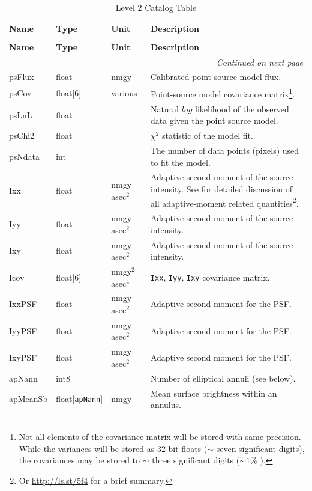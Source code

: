 \documentclass[SE,lsstdraft,toc]{lsstdoc}
\newcommand{\oldtext}[1]{{\color{red} #1}}
\newenvironment{schema}[3]{%
\setlength\LTleft{0pt}
\setlength\LTright{\fill}
\begin{longtable}{p{0.2\textwidth}p{0.14\textwidth}p{0.14\textwidth}p{0.41\textwidth}}

\caption[#1]{#2\label{#3}}\\

\hline \textbf{Name} & \textbf{Type} & \textbf{Unit} & \textbf{Description}\\ \hline
\endfirsthead

\caption[#1]{#2}\\

\hline \textbf{Name} & \textbf{Type} & \textbf{Unit} & \textbf{Description}\\ \hline
\endhead

\hline \multicolumn{4}{r}{\emph{Continued on next page}} \\
\endfoot

\hline\hline
\endlastfoot
}{%
\hline
\end{longtable}
}
\begin{document}
\begin{schema}{\Source Table}{Level 2 Catalog \Source Table}{tbl:sourceTable}
psFlux & float & nmgy & Calibrated point source model flux.\\

psCov & float[6] & various & Point-source model covariance matrix\footnote{Not all elements of the covariance matrix will be stored with same precision. While the variances will be stored as 32 bit floats ($\sim$ seven significant digits), the covariances may be stored to $\sim$ three significant digits ($\sim 1$\% ).}. \\

psLnL & float & ~ & Natural $log$ likelihood of the observed data given the point source model. \\

psChi2 & float & ~ & $\chi^2$ statistic of the model fit. \\

psNdata & int & ~ & The number of data points (pixels) used to fit the model. \\

Ixx & float & \oldtext{nmgy} asec$^{2}$ & Adaptive second moment of the source intensity. See \citet{2002AJ....123..583B} for detailed discussion of all adaptive-moment related quantities\footnote{Or \url{http://ls.st/5f4} for a brief summary.}. \\

Iyy & float & \oldtext{nmgy} asec$^{2}$ & Adaptive second moment of the source intensity. \\

Ixy & float & \oldtext{nmgy} asec$^{2}$ & Adaptive second moment of the source intensity. \\

Icov & float[6] & \oldtext{nmgy$^{2}$} asec$^{4}$ & \texttt{Ixx}, \texttt{Iyy}, \texttt{Ixy} covariance matrix. \\

IxxPSF & float & \oldtext{nmgy} asec$^{2}$ & Adaptive second moment for the PSF. \\

IyyPSF & float & \oldtext{nmgy} asec$^{2}$ & Adaptive second moment for the PSF. \\

IxyPSF & float & \oldtext{nmgy} asec$^{2}$ & Adaptive second moment for the PSF. \\

apNann & int8 & ~ & Number of elliptical annuli (see below). \\

apMeanSb & float[\texttt{apNann}] & nmgy & Mean surface brightness within an annulus. \\


\end{schema}
\end{document}
